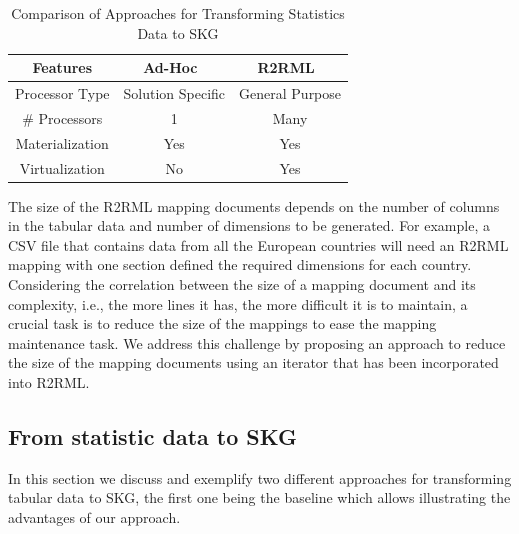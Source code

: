 \begin{table}[tbp]
\caption[KG Construction Approaches from Statistics Data]{Comparison of Approaches for Transforming Statistics Data to SKG}
\label{table:chapter4_compare}
\begin{tabular}{c|c|c}
\hline
\textbf{Features} & \textbf{Ad-Hoc~\citep{corcho2017publishing}}   & \textbf{R2RML~\citep{R2RML}}  \\ \hline
Processor Type    & Solution Specific & General Purpose \\ 
\# Processors     & 1                 & Many            \\
Materialization   & Yes               & Yes             \\ 
Virtualization    & No                & Yes             \\ \hline
\end{tabular}
\end{table}

The size of the R2RML mapping documents depends on the number of columns in the tabular data and number of dimensions to be generated. For example, a CSV file that contains data from all the European countries will need an R2RML mapping with one section defined the required dimensions for each country. Considering the correlation between the size of a mapping document and its complexity, i.e., the more lines it has, the more difficult it is to maintain, a crucial task is to reduce the size of the mappings to ease the mapping maintenance task. We address this challenge by proposing an approach to reduce the size of the mapping documents using an iterator that has been incorporated into R2RML.


\subsection{From statistic data to SKG}
In this section we discuss and exemplify two different approaches for transforming tabular data to SKG, the first one being the baseline which allows illustrating the advantages of our approach.

